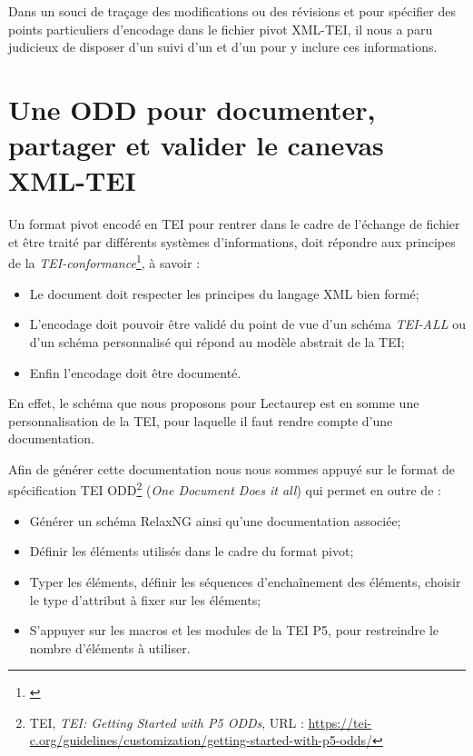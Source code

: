 Dans un souci de traçage des modifications ou des révisions et pour spécifier des points particuliers d'encodage dans le fichier pivot XML-TEI, il nous a paru judicieux de disposer d'un  suivi d'un 
 et d'un  pour y inclure ces informations.

\section{Une ODD pour documenter, partager et valider le canevas XML-TEI}

Un format pivot encodé en TEI pour rentrer dans le cadre de l'échange de fichier et être traité par différents systèmes d'informations, doit répondre aux principes de la \textit{TEI-conformance}\footnote{\cite{camps_structuration_2017}}, à savoir :
\begin{itemize}
    \item Le document doit respecter les principes du langage XML bien formé;
    \item L'encodage doit pouvoir être validé du point de vue d'un schéma \textit{TEI-ALL} ou d'un schéma personnalisé qui répond au modèle abstrait de la TEI;
    \item Enfin l'encodage doit être documenté.
\end{itemize}

En effet, le schéma que nous proposons pour Lectaurep est en somme une personnalisation de la TEI, pour laquelle il faut rendre compte d'une documentation.

Afin de générer cette documentation nous nous sommes appuyé sur le format de spécification TEI ODD\footnote{TEI, \textit{TEI: Getting Started with P5 ODDs}, URL : \url{https://tei-c.org/guidelines/customization/getting-started-with-p5-odds/}} (\textit{One Document Does it all}) qui permet en outre de :
\begin{itemize}
    \item Générer un schéma RelaxNG ainsi qu'une documentation associée;
    \item Définir les éléments utilisés dans le cadre du format pivot;
    \item Typer les éléments, définir les séquences d'enchaînement des éléments, choisir le type d'attribut à fixer sur les éléments;
    \item S'appuyer sur les macros et les modules de la TEI P5, pour restreindre le nombre d'éléments à utiliser.
\end{itemize}

